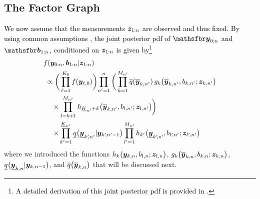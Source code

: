 \documentclass[10pt, twoside, romanappendices]{IEEEtran}
\providecommand{\rd}{\textcolor{black}}
\providecommand{\ist}{\hspace*{.3mm}}
\providecommand{\rmv}{\hspace*{-.3mm}}
\providecommand{\nn}{\nonumber}
\begin{document}
 \subsection{The Factor Graph}
\label{sec:factorGraph}

\rd{We now assume that the measurements $\bm{z}_{1:n}$ are observed and thus fixed.  By using common assumptions \cite{BarWilTia:B11,Mah:B07,MeyKroWilLauHlaBraWin:J18,GraFatSve:J19,GraBauReu:J17}, the joint posterior \ac{pdf} of $\RV{y}_{0:n}$ and $\RV{b}_{1:n}$, conditioned on $\bm{z}_{1:n}$ is given \vspace{0mm} by\footnote{\rd{A detailed derivation of this joint posterior \ac{pdf} is provided in \cite[Section~1]{MeyWil:SM21}.}}}
\begin{align}
&f( \V{y}_{0:n}, \V{b}_{1:n}|\V{z}_{1:n})  \nn\\
&\hspace{1mm}\propto \bigg( \prod^{K_0}_{\ell = 1} f(\V{y}_{\ell,0})  \bigg) \rmv\rmv \prod^{n}_{n' = 1}   \bigg(  \prod^{M_{n'}}_{k = 1} \overline{q}(\overline{\V{y}}_{k,n'}) \ist\ist g_k\big( \overline{\V{y}}_{k,n'}, b_{k, n'}; \V{z}_{k,n'} \big) \nn\\
& \hspace{4.3mm} \times \prod^{M_{n'}}_{l = k \rmv+\rmv 1} \ist h_{\underline{K}_{n'} + k}  \big( \overline{\V{y}}_{k,n'}, b_{l,n'}; \V{z}_{l,n'} \big)  \rmv \bigg) \nn \\
&\hspace{4.3mm}\times \hspace{-.3mm} \prod^{\underline{K}_{n'}}_{k' = 1} \underline{q}\big(\underline{\V{y}}_{k'\rmv\rmv,n'} | \V{y}_{k'\rmv\rmv,n'-1}\big) \prod^{M_{n'}}_{l' = 1} h_{k'}\big( \underline{\V{y}}_{k'\rmv\rmv,n'}\rmv, b_{l'\rmv\rmv,n'}; \V{z}_{l'\rmv,n'} \big)  \label{eq:factorGraph}
\end{align}
where we introduced the functions $ h_k\big( \bm{y}_{k,n}, b_{l,n}; \bm{z}_{l,n} \big)$, $g_k\big( \overline{\bm{y}}_{k,n}, b_{k,n}; \bm{z}_{k,n} \big)$, $\underline{q}\big(\underline{\bm{y}}_{k,n} | \bm{y}_{k,n-1}\big)$, and $\overline{q}\big(\overline{\bm{y}}_{k,n}\big)$ that will be discussed next. 
\end{document}
